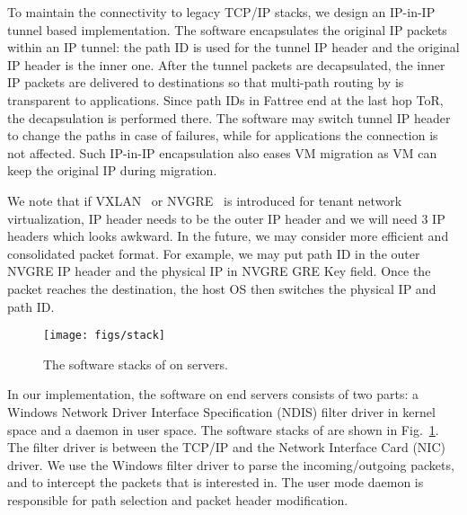To maintain the connectivity to legacy TCP/IP stacks, we design an IP-in-IP tunnel based implementation. The \sys software encapsulates the original IP packets within an IP tunnel: the path ID is used for the tunnel IP header and the original IP header is the inner one. After the tunnel packets are decapsulated, the inner IP packets are delivered to destinations so that multi-path routing by \sys is transparent to applications. Since path IDs in Fattree end at the last hop ToR, the decapsulation is performed there. The \sys software may switch tunnel IP header to change the paths in case of failures, while for applications the connection is not affected. Such IP-in-IP encapsulation also eases VM migration as VM can keep the original IP during migration.


We note that if VXLAN~\cite{vxlan} or NVGRE~\cite{nvgre} is introduced for tenant network virtualization, \sys IP header needs to be the outer IP header and we will need 3 IP headers which looks awkward. In the future, we may consider more efficient and consolidated packet format. For example, we may put path ID in the outer NVGRE IP header and the physical IP in NVGRE GRE Key field. Once the packet reaches the destination, the host OS then switches the physical IP and path ID.

\begin{figure}[t]
\centering
\texttt{[image: figs/stack]}
\caption{The software stacks of \sys on servers.}
\label{fig:serverstack}
\vspace{-0.2in}
\end{figure}

In our implementation, the \sys software on end servers consists of two parts: a Windows Network Driver Interface Specification (NDIS) filter driver in kernel space and a \sys daemon in user space. The software stacks of \sys are shown in Fig.~\ref{fig:serverstack}. The \sys filter driver is between the TCP/IP and the Network Interface Card (NIC) driver. We use the Windows filter driver to parse the incoming/outgoing packets, and to intercept the packets that \sys is interested in. The \sys user mode daemon is responsible for path selection and packet header modification. 

